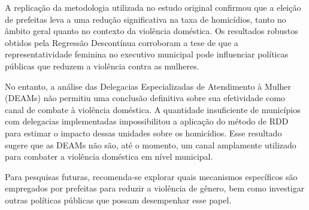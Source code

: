 A replicação da metodologia utilizada no estudo original confirmou que a eleição de prefeitas leva a uma redução significativa na taxa de homicídios, tanto no âmbito geral quanto no contexto da violência doméstica. Os resultados robustos obtidos pela Regressão Descontínua corroboram a tese de que a representatividade feminina no executivo municipal pode influenciar políticas públicas que reduzem a violência contra as mulheres.

No entanto, a análise das Delegacias Especializadas de Atendimento à Mulher (DEAMs) não permitiu uma conclusão definitiva sobre sua efetividade como canal de combate à violência doméstica. A quantidade insuficiente de municípios com delegacias implementadas impossibilitou a aplicação do método de RDD para estimar o impacto dessas unidades sobre os homicídios. Esse resultado sugere que as DEAMs não são, até o momento, um canal amplamente utilizado para combater a violência doméstica em nível municipal.

Para pesquisas futuras, recomenda-se explorar quais mecanismos específicos são empregados por prefeitas para reduzir a violência de gênero, bem como investigar outras políticas públicas que possam desempenhar esse papel.



\printbibliography[keyword = close-elections]

